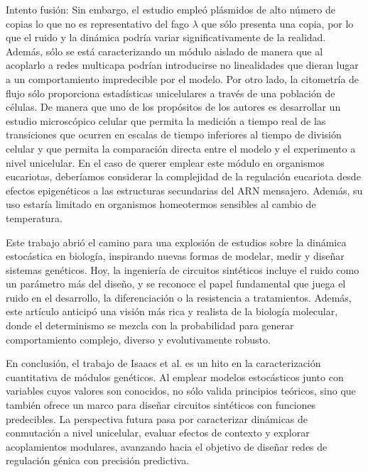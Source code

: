 \documentclass[nochap]{config/ejercicios}
\begin{document}
Intento fusión:
Sin embargo, el estudio empleó plásmidos de alto número de copias lo que no es representativo del fago $\lambda$ que sólo presenta una copia, por lo que el ruido y la dinámica podría variar significativamente de la realidad. Además, sólo se está caracterizando un módulo aislado de manera que al acoplarlo a redes multicapa podrían introducirse no linealidades que dieran lugar a un comportamiento impredecible por el modelo. Por otro lado, la citometría de flujo sólo proporciona estadísticas unicelulares a través de una población de células. De manera que uno de los propósitos de los autores es desarrollar un estudio microscópico celular que permita la medición a tiempo real de las transiciones que ocurren en escalas de tiempo inferiores al tiempo de división celular y que permita la comparación directa entre el modelo y el experimento a nivel unicelular. En el caso de querer emplear este módulo en organismos eucariotas, deberíamos considerar la complejidad de la regulación eucariota desde efectos epigenéticos a las estructuras secundarias del ARN mensajero. Además, su uso estaría limitado en organismos homeotermos sensibles al cambio de temperatura.


Este trabajo abrió el camino para una explosión de estudios sobre la dinámica estocástica en biología, inspirando nuevas formas de modelar, medir y diseñar sistemas genéticos. Hoy, la ingeniería de circuitos sintéticos incluye el ruido como un parámetro más del diseño, y se reconoce el papel fundamental que juega el ruido en el desarrollo, la diferenciación o la resistencia a tratamientos. Además, este artículo anticipó una visión más rica y realista de la biología molecular, donde el determinismo se mezcla con la probabilidad para generar comportamiento complejo, diverso y evolutivamente robusto.


En conclusión, el trabajo de Isaacs et al. es un hito en la caracterización cuantitativa de módulos genéticos. Al emplear modelos estocásticos junto con variables cuyos valores son conocidos, no sólo valida principios teóricos, sino que también ofrece un marco para diseñar circuitos sintéticos con funciones predecibles. La perspectiva futura pasa por caracterizar dinámicas de conmutación a nivel unicelular, evaluar efectos de contexto y explorar acoplamientos modulares, avanzando hacia el objetivo de diseñar redes de regulación génica con precisión predictiva.

\printbibliography
\end{document}
